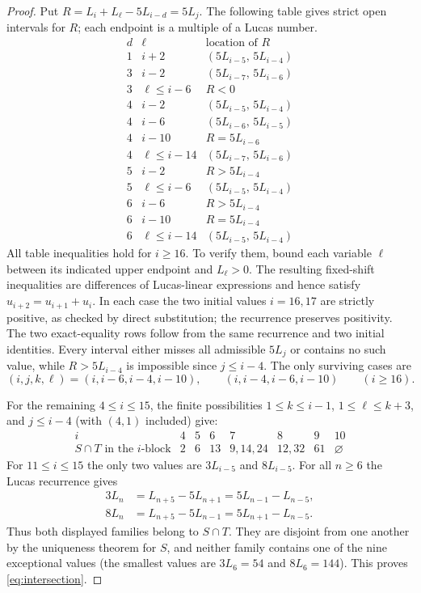 \documentclass[11pt]{article}
\begin{document}
\begin{proof}
Put $R=L_i+L_\ell-5L_{i-d}=5L_j$.
The following table gives strict open intervals for $R$;
each endpoint is a multiple of a Lucas number.
\[
\begin{array}{c|c|l}
d&\ell&\text{location of }R\\ \hline
1&i+2&(5L_{i-5},\,5L_{i-4})\\
3&i-2&(5L_{i-7},\,5L_{i-6})\\
3&\ell\le i-6&R<0\\
4&i-2&(5L_{i-5},\,5L_{i-4})\\
4&i-6&(5L_{i-6},\,5L_{i-5})\\
4&i-10&R=5L_{i-6}\\
4&\ell\le i-14&(5L_{i-7},\,5L_{i-6})\\
5&i-2&R>5L_{i-4}\\
5&\ell\le i-6&(5L_{i-5},\,5L_{i-4})\\
6&i-6&R>5L_{i-4}\\
6&i-10&R=5L_{i-4}\\
6&\ell\le i-14&(5L_{i-5},\,5L_{i-4})
\end{array}
\]
All table inequalities hold for $i\ge16$.
To verify them, bound each variable $\ell$ between its
indicated upper endpoint and $L_\ell>0$.
The resulting fixed-shift inequalities are differences of
Lucas-linear expressions and hence satisfy
$u_{i+2}=u_{i+1}+u_i$. In each case the two initial values
$i=16,17$ are strictly positive, as checked by direct substitution;
the recurrence preserves positivity. The two exact-equality
rows follow from the same recurrence and two initial identities.
Every interval either misses all admissible $5L_j$ or contains
no such value, while $R>5L_{i-4}$ is impossible since $j\le i-4$.
The only surviving cases are
\[
(i,j,k,\ell)=(i,i-6,i-4,i-10),\qquad
(i,i-4,i-6,i-10)\qquad(i\ge16).
\]

For the remaining $4\le i\le15$, the finite possibilities
$1\le k\le i-1$, $1\le\ell\le k+3$, and
$j\le i-4$ (with $(4,1)$ included) give:
\[
\begin{array}{c|ccccccc}
i&4&5&6&7&8&9&10\\ \hline
S\cap T\text{ in the }i\text{-block}
&2&6&13&9,14,24&12,32&61&\varnothing
\end{array}
\]
For $11\le i\le15$ the only two values are
$3L_{i-5}$ and $8L_{i-5}$.
For all $n\ge6$ the Lucas recurrence gives
\begin{align*}
3L_n&=L_{n+5}-5L_{n+1}=5L_{n-1}-L_{n-5},\\
8L_n&=L_{n+5}-5L_{n-1}=5L_{n+1}-L_{n-5}.
\end{align*}
Thus both displayed families belong to $S\cap T$.
They are disjoint from one another by the uniqueness theorem
for $S$, and neither family contains one of the nine exceptional
values (the smallest values are $3L_6=54$ and $8L_6=144$). This proves \eqref{eq:intersection}.
\end{proof}
\end{document}
